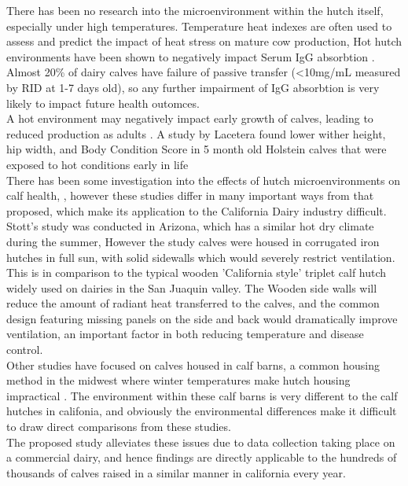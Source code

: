\documentclass[12pt]{article}
\begin{document}
	There has been no research into the microenvironment within the hutch itself, especially under high temperatures. Temperature heat indexes are often used to assess and predict the impact of heat stress on mature cow production, 
	Hot hutch environments have been shown to negatively impact Serum IgG absorbtion \cite{Stott1976}. Almost 20\% of dairy calves have failure of passive transfer (<10mg/mL measured by RID at 1-7 days old)\cite{NAHMS2007}, so any further impairment of IgG absorbtion is very likely to impact future health outomces.\cite{Besser1994}\\
	A hot environment may negatively impact early growth of calves, leading to reduced production as adults \cite{Hoffman1997}. A study by Lacetera found lower wither height, hip width, and Body Condition Score in 5 month old Holstein calves that were exposed to hot conditions early in life \cite{lacetera1994} \\
	\newpage
	There has been some investigation into the effects of hutch microenvironments on calf health, \cite{Stott1976,Nordlund2008,Lago2006}, however these studies differ  in many important ways from that proposed, which make its application to the California Dairy industry difficult. 
	Stott's study was conducted in Arizona, which has a similar hot dry climate during the summer, However the study calves were housed in corrugated iron hutches in full sun, with solid sidewalls which would severely restrict ventilation\cite{Stott1976}. This is in comparison to the typical wooden 'California style' triplet calf hutch widely used on dairies in the San Juaquin valley. The Wooden side walls will reduce the amount of radiant heat transferred to the calves, and the common design featuring missing panels on the side and back would dramatically improve ventilation, an important factor in both reducing temperature and disease control\cite{Smith2002a}.\\
	Other studies have focused on calves housed in calf barns, a common housing method in the midwest where winter temperatures make hutch housing impractical \cite{Lago2006}. The environment within these calf barns is very different to the calf hutches in califonia, and obviously the environmental differences make it difficult to draw direct comparisons from these studies.\\


	The proposed study alleviates these issues due to data collection taking place on a commercial dairy, and hence findings are directly applicable to the hundreds of thousands of calves raised in a similar manner in california every year. %
\end{document}
